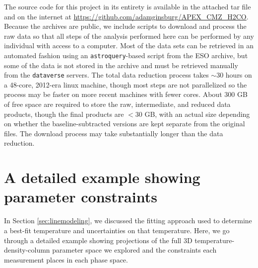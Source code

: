 The source code for this project in its entirety is available in the attached
tar file and on the internet at
\url{https://github.com/adamginsburg/APEX_CMZ_H2CO}.
Because the archives are public, we include scripts to download and process the
raw data so that all steps of the analysis performed here can be performed by
any individual with access to a computer.  Most of the data sets can be retrieved
in an automated fashion using an \texttt{astroquery}-based script from the ESO archive,
but some of the data is not stored in the archive and must be retrieved manually from the
\texttt{dataverse} servers. The total data reduction process
takes $\sim30$ hours on a 48-core, 2012-era linux machine, though most steps
are not parallelized so the process may be faster on more recent machines with
fewer cores.  About 300 GB of free space are required to store the raw,
intermediate, and reduced data products, though the final products are $<30$
GB, with an actual size depending on whether the baseline-subtracted versions
are kept separate from the original files.  The download process may take
substantially longer than the data reduction.


\section{A detailed example showing parameter constraints}
In Section \ref{sec:linemodeling}, we discussed the fitting approach used
to determine a best-fit temperature and uncertainties on that temperature.
Here, we go through a detailed example showing projections of the full 3D
temperature-density-column parameter space we explored and the constraints
each measurement places in each phase space.

